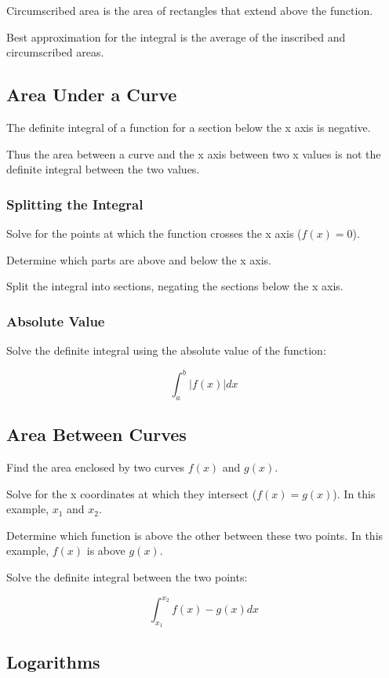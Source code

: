 \documentclass[a4paper,11pt]{article}
\begin{document}
Circumscribed area is the area of rectangles that extend above the function.

Best approximation for the integral is the average of the inscribed and
circumscribed areas.


\subsection{Area Under a Curve}

The definite integral of a function for a section below the x axis is negative.

Thus the area between a curve and the x axis between two x values is not the
definite integral between the two values.


\subsubsection{Splitting the Integral}

Solve for the points at which the function crosses the x axis ($f(x) = 0$).

Determine which parts are above and below the x axis.

Split the integral into sections, negating the sections below the x axis.


\subsubsection{Absolute Value}

Solve the definite integral using the absolute value of the function:

$$
\int_a^b \lvert f(x) \rvert dx
$$


\subsection{Area Between Curves}

Find the area enclosed by two curves $f(x)$ and $g(x)$.

Solve for the x coordinates at which they intersect ($f(x) = g(x)$). In this
example, $x_1$ and $x_2$.

Determine which function is above the other between these two points. In this
example, $f(x)$ is above $g(x)$.

Solve the definite integral between the two points:

$$
\int_{x_1}^{x_2} f(x) - g(x) dx
$$


\subsection{Logarithms}
\end{document}
